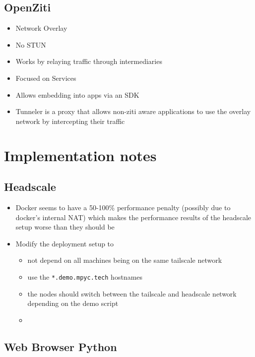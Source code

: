 \hypertarget{openziti}{%
\section{OpenZiti}\label{openziti}}

\begin{itemize}
\tightlist
\item
  Network Overlay
\item
  No STUN
\item
  Works by relaying traffic through intermediaries
\item
  Focused on Services
\item
  Allows embedding into apps via an SDK
\item
  Tunneler is a proxy that allows non-ziti aware applications to use the
  overlay network by intercepting their traffic
\end{itemize}

\hypertarget{implementation-notes}{%
\chapter{Implementation notes}\label{implementation-notes}}

\hypertarget{headscale}{%
\section{Headscale}\label{headscale}}

\begin{itemize}
\tightlist
\item
  Docker seems to have a 50-100\% performance penalty (possibly due to
  docker's internal NAT) which makes the performance results of the
  headscale setup worse than they should be
\item
  Modify the deployment setup to

  \begin{itemize}
  \tightlist
  \item
    not depend on all machines being on the same tailscale network
  \item
    use the \texttt{*.demo.mpyc.tech} hostnames
  \item
    the nodes should switch between the tailscale and headscale network
    depending on the demo script
  \item
  \end{itemize}
\end{itemize}

\hypertarget{web-browser-python}{%
\section{Web Browser Python}\label{web-browser-python}}

